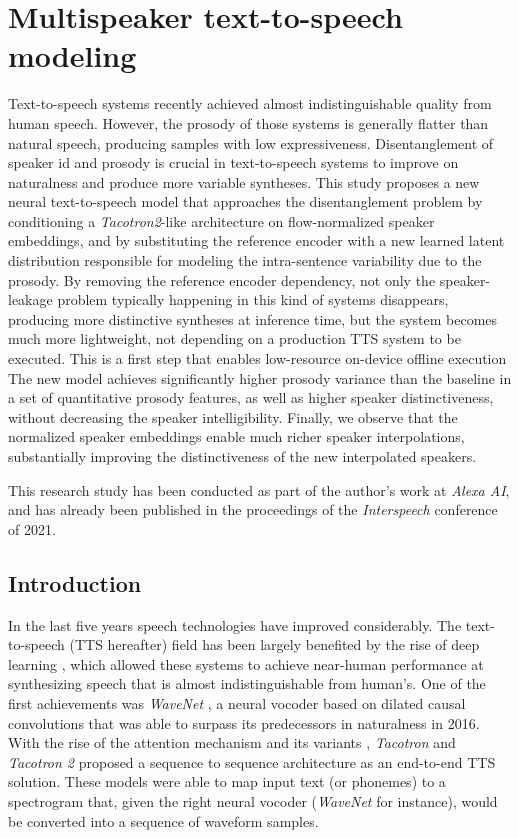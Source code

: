 \chapter{Multispeaker text-to-speech modeling} \label{ch:tts}

Text-to-speech systems recently achieved almost indistinguishable quality from human speech. However, the prosody of those systems is generally flatter than natural speech, producing samples with low expressiveness. Disentanglement of speaker id and prosody is crucial in text-to-speech systems to improve on naturalness and produce more variable syntheses. This study proposes a new neural text-to-speech model that approaches the disentanglement problem by conditioning a \textit{Tacotron2}-like architecture on flow-normalized speaker embeddings, and by substituting the reference encoder with a new learned latent distribution responsible for modeling the intra-sentence variability due to the prosody. By removing the reference encoder dependency, not only the speaker-leakage problem typically happening in this kind of systems disappears, producing more distinctive syntheses at inference time, but the system becomes much more lightweight, not depending on a production TTS system to be executed. This is a first step that enables low-resource on-device offline execution The new model achieves significantly higher prosody variance than the baseline in a set of quantitative prosody features, as well as higher speaker distinctiveness, without decreasing the speaker intelligibility. Finally, we observe that the normalized speaker embeddings enable much richer speaker interpolations, substantially improving the distinctiveness of the new interpolated speakers.

 This research study has been conducted as part of the author's work at \textit{Alexa AI}, and has already been published in the proceedings of the \textit{Interspeech} conference of 2021.

\section{Introduction}
In the last five years speech technologies have improved considerably. The text-to-speech (TTS hereafter) field has been largely benefited by the rise of deep learning \autocite{Sisman2021}, which allowed these systems to achieve near-human performance at synthesizing speech that is almost indistinguishable from human's. One of the first achievements was \textit{WaveNet} \autocite{vanderoord2016}, a neural vocoder based on dilated causal convolutions that was able to surpass its predecessors in naturalness in 2016. With the rise of the attention mechanism and its variants \autocite{bahdanau2015,vaswani2017,chaudhari2019}, \textit{Tacotron} \autocite{Wang2017} and \textit{Tacotron 2} \autocite{Shen2018,liu2019b} proposed a sequence to sequence architecture as an end-to-end TTS solution. These models were able to map input text (or phonemes) to a spectrogram that, given the right neural vocoder (\textit{WaveNet} for instance), would be converted into a sequence of waveform samples.

